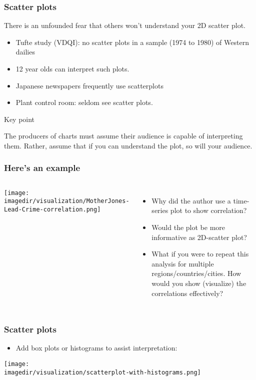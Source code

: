 \begin{frame}\frametitle{Scatter plots}
	There is an unfounded fear that others won't understand your 2D scatter plot. 
	\begin{itemize}
		\item	Tufte study (VDQI): no scatter plots in a sample (1974 to 1980) of Western dailies 
		\item	12 year olds can interpret such plots. 
		\item	Japanese newspapers frequently use scatterplots 
		\item	Plant control room: seldom see scatter plots. 
	\end{itemize}
	\begin{block}
		{Key point} 
		\begin{center}
			The producers of charts must assume their audience is capable of interpreting them. Rather, assume that if you can understand the plot, so will your audience. 
		\end{center}
	\end{block}
\end{frame}

\begin{frame}\frametitle{Here's an example}
	\begin{columns}[t]
			\begin{center}
				\texttt{[image: \\imagedir/visualization/MotherJones-Lead-Crime-correlation.png]}
			\end{center}
			\begin{itemize}
				\item	Why did the author use a time-series plot to show correlation?
				\item	Would the plot be more informative as 2D-scatter plot?
				\item	What if you were to repeat this analysis for multiple regions/countries/cities. How would you show (visualize) the correlations effectively?
			\end{itemize}
	\end{columns}
	\vspace{-3pt}
\end{frame}

\begin{frame}\frametitle{Scatter plots}
	\begin{itemize}
		\item	Add box plots or histograms to assist interpretation: 
	\end{itemize}
	\begin{center}
		\texttt{[image: \\imagedir/visualization/scatterplot-with-histograms.png]}
	\end{center}
\end{frame}

